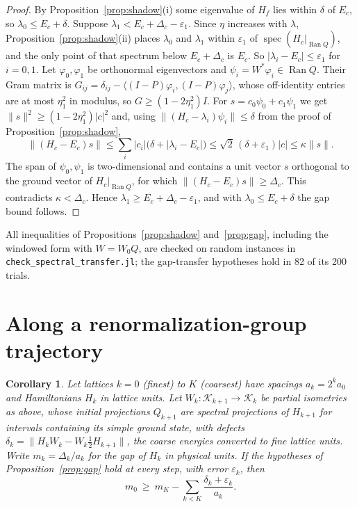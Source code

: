 \documentclass[11pt]{article}
\newtheorem{corollary}[proposition]{Corollary}
\theoremstyle{remark}
\newcommand{\K}{\mathcal K}
\newcommand{\Ran}{\operatorname{Ran}}
\newcommand{\spec}{\operatorname{spec}}
\begin{document}
\begin{proof}
By Proposition~\ref{prop:shadow}(i) some eigenvalue of $H_f$ lies within $\delta$ of $E_c$, so $\lambda_0\le E_c+\delta$. Suppose $\lambda_1<E_c+\Delta_c-\varepsilon_1$. Since $\eta$ increases with $\lambda$, Proposition~\ref{prop:shadow}(ii) places $\lambda_0$ and $\lambda_1$ within $\varepsilon_1$ of $\spec(H_c|_{\Ran Q})$, and the only point of that spectrum below $E_c+\Delta_c$ is $E_c$. So $|\lambda_i-E_c|\le\varepsilon_1$ for $i=0,1$. Let $\varphi_0,\varphi_1$ be orthonormal eigenvectors and $\psi_i=W^*\varphi_i\in\Ran Q$. Their Gram matrix is $G_{ij}=\delta_{ij}-\langle(I-P)\varphi_i,(I-P)\varphi_j\rangle$, whose off-identity entries are at most $\eta_1^2$ in modulus, so $G\ge(1-2\eta_1^2)I$. For $s=c_0\psi_0+c_1\psi_1$ we get $\|s\|^2\ge(1-2\eta_1^2)|c|^2$ and, using $\|(H_c-\lambda_i)\psi_i\|\le\delta$ from the proof of Proposition~\ref{prop:shadow},
\[
 \|(H_c-E_c)s\|\le\sum_i|c_i|\bigl(\delta+|\lambda_i-E_c|\bigr)\le\sqrt2\,(\delta+\varepsilon_1)|c|\le\kappa\|s\| .
\]
The span of $\psi_0,\psi_1$ is two-dimensional and contains a unit vector $s$ orthogonal to the ground vector of $H_c|_{\Ran Q}$, for which $\|(H_c-E_c)s\|\ge\Delta_c$. This contradicts $\kappa<\Delta_c$. Hence $\lambda_1\ge E_c+\Delta_c-\varepsilon_1$, and with $\lambda_0\le E_c+\delta$ the gap bound follows.
\end{proof}

All inequalities of Propositions~\ref{prop:shadow} and~\ref{prop:gap}, including the windowed form with $W=W_0Q$, are checked on random instances in \texttt{check\_spectral\_transfer.jl}; the gap-transfer hypotheses hold in 82 of its 200 trials.

\section{Along a renormalization-group trajectory}

\begin{corollary}\label{cor:chain}
Let lattices $k=0$ (finest) to $K$ (coarsest) have spacings $a_k=2^ka_0$ and Hamiltonians $H_k$ in lattice units. Let $W_k:\K_{k+1}\to\K_k$ be partial isometries as above, whose initial projections $Q_{k+1}$ are spectral projections of $H_{k+1}$ for intervals containing its simple ground state, with defects $\delta_k=\|H_kW_k-W_k\tfrac12H_{k+1}\|$, the coarse energies converted to fine lattice units. Write $m_k=\Delta_k/a_k$ for the gap of $H_k$ in physical units. If the hypotheses of Proposition~\ref{prop:gap} hold at every step, with error $\varepsilon_k$, then
\[
 m_0\ \ge\ m_K-\sum_{k<K}\frac{\delta_k+\varepsilon_k}{a_k} .
\]
\end{corollary}
\end{document}
